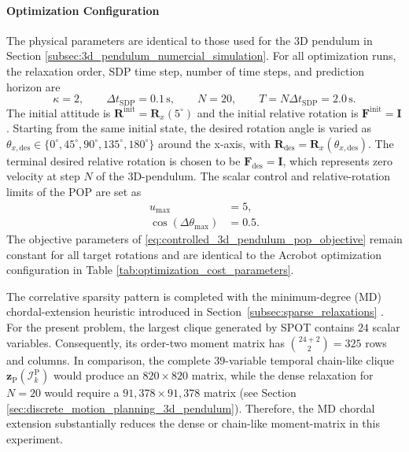 \paragraph{Optimization Configuration}
The physical parameters are identical to those used for the $3$D pendulum in
Section \ref{subsec:3d_pendulum_numercial_simulation}.
For all optimization runs, the
relaxation order, SDP time step, number of time steps, and prediction horizon
are
\begin{equation}
    \kappa=2,
    \qquad
    \Delta t_{\mathrm{SDP}}=0.1\,\mathrm{s},
    \qquad
    N=20,
    \qquad
    T=N\Delta t_{\mathrm{SDP}}=2.0\,\mathrm{s}.
    \label{eq:3d_pendulum_optimization_configuration}
\end{equation}
The initial attitude is $\bm{R}^{\mathrm{init}}=\bm{R}_x(5^\circ)$ and the initial
relative rotation is $\bm F^{\mathrm{init}}=\bm I$. Starting from the same
initial state, the desired rotation angle is varied as
\(\theta_{x,\mathrm{des}}\in
\{0^\circ,45^\circ,90^\circ,135^\circ,180^\circ\}\) around the x-axis, with
\(\bm{R}_{\mathrm{des}}=\bm{R}_x(\theta_{x,\mathrm{des}})\). The terminal 
desired relative rotation is chosen to be $\bm{F}_{\mathrm{des}}=\bm{I}$, which represents 
zero velocity at step $N$ of the 3D-pendulum.
The scalar control and relative-rotation limits of the POP are set as
\begin{align*}
    u_{\max}
    &=5,
    \\
    \cos(\Delta\theta_{\max})
    &=0.5.
\end{align*}
The objective parameters of \eqref{eq:controlled_3d_pendulum_pop_objective} 
remain constant for all target rotations and are
identical to the Acrobot optimization configuration in
Table \ref{tab:optimization_cost_parameters}.

The correlative sparsity pattern is completed with the minimum-degree (MD)
chordal-extension heuristic introduced in
Section~\ref{subsec:sparse_relaxations} \cite{Kang_2025Global}. For the present
problem, the largest clique generated by SPOT contains $24$ scalar variables.
Consequently, its order-two moment matrix has
\(\binom{24+2}{2}=325\) rows and columns. In comparison, the complete
$39$-variable temporal
chain-like clique $\bm{z}_{\mathrm{P}}(\mathcal I_k^{\mathrm{P}})$ would produce an $820\times820$ matrix, while the dense
relaxation for $N=20$ would require a
$91{,}378\times91{,}378$ matrix (see Section \ref{sec:discrete_motion_planning_3d_pendulum}).
Therefore, the MD chordal extension substantially
reduces the dense or chain-like moment-matrix in this experiment.

